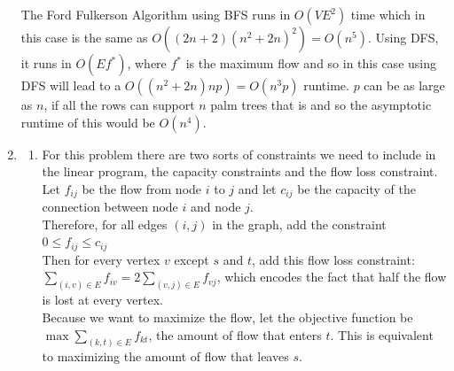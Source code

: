 \documentclass{article}
\begin{document}
\begin{enumerate}
	The Ford Fulkerson Algorithm using BFS runs in $O(VE^2)$ time which in this case is the same as $O((2n+2)(n^2+2n)^2) = O(n^5)$.  Using DFS, it runs in $O(Ef^*)$, where $f^*$ is the maximum flow and so in this case using DFS will lead to a $O((n^2+2n)np) = O(n^3p)$ runtime.  $p$ can be as large as $n$, if all the rows can support $n$ palm trees that is and so the asymptotic runtime of this would be $O(n^4)$.  	
	\item
	\begin{enumerate}
		\item For this problem there are two sorts of constraints we need to include in the linear program, the capacity constraints and the flow loss constraint.  \\
		Let $f_{ij}$ be the flow from node $i$ to $j$ and let $c_{ij}$ be the capacity of the connection between node $i$ and node $j$.  \\
		Therefore, for all edges $(i,j)$ in the graph, add the constraint $0 \leq f_{ij} \leq c_{ij}$\\
		Then for every vertex $v$ except $s$ and $t$, add this flow loss constraint: $\displaystyle\sum_{(i,v)\in E}f_{iv} = 2\sum_{(v,j)\in E}f_{vj}$, which encodes the fact that half the flow is lost at every vertex.  \\
		Because we want to maximize the flow, let the objective function be $\displaystyle\max\sum_{(k,t)\in E}f_{kt}$, the amount of flow that enters $t$.  This is equivalent to maximizing the amount of flow that leaves $s$.  
		

\end{enumerate}
\end{enumerate}
\end{document}
